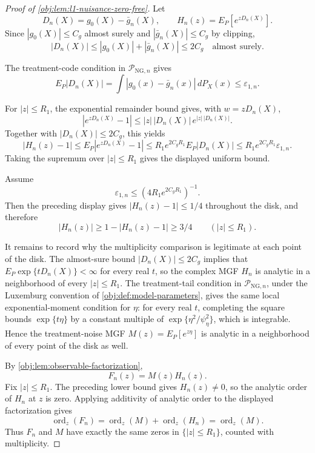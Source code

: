 \documentclass[11pt]{article}
\begin{document}
\begin{proof}[Proof of \cref{obj:lem:l1-nuisance-zero-free}]
Let
\[
D_n(X)=g_0(X)-\bar g_n(X),
\qquad
H_n(z)=E_P[e^{zD_n(X)}].
\]
Since \(|g_0(X)|\le C_g\) almost surely and \(|\bar g_n(X)|\le C_g\) by
clipping,
\[
|D_n(X)|\le |g_0(X)|+|\bar g_n(X)|\le2C_g
\quad\text{almost surely}.
\]

The treatment-code condition in \(\mathcal P_{\mathrm{NG},n}\) gives
\[
E_P|D_n(X)|
=
\int |g_0(x)-\bar g_n(x)|\,dP_X(x)
\le
\varepsilon_{1,n}.
\]

For \(|z|\le R_1\), the exponential remainder bound gives, with
\(w=zD_n(X)\),
\[
|e^{zD_n(X)}-1|
\le
|z|\,|D_n(X)|\,e^{|z|\,|D_n(X)|}.
\]
Together with \(|D_n(X)|\le2C_g\), this yields
\[
|H_n(z)-1|
\le
E_P|e^{zD_n(X)}-1|
\le
R_1 e^{2C_gR_1}E_P|D_n(X)|
\le
R_1 e^{2C_gR_1}\varepsilon_{1,n}.
\]
Taking the supremum over \(|z|\le R_1\) gives the displayed uniform bound. %

Assume
\[
\varepsilon_{1,n}\le (4R_1e^{2C_gR_1})^{-1}.
\]
Then the preceding display gives \(|H_n(z)-1|\le1/4\) throughout the disk, and
therefore
\[
|H_n(z)|\ge 1-|H_n(z)-1|\ge3/4
\qquad(|z|\le R_1).
\]

It remains to record why the multiplicity comparison is legitimate at each
point of the disk.  The almost-sure bound \(|D_n(X)|\le2C_g\) implies that
\(E_P\exp\{tD_n(X)\}<\infty\) for every real \(t\), so the complex MGF
\(H_n\) is analytic in a neighborhood of every \(|z|\le R_1\).  The treatment-tail
condition in \(\mathcal P_{\mathrm{NG},n}\), under the Luxemburg convention of
\cref{obj:def:model-parameters}, gives the same local exponential-moment
condition for \(\eta\): for every real \(t\), completing the square bounds
\(\exp\{t\eta\}\) by a constant multiple of
\(\exp\{\eta^2/\psi_\eta^2\}\), which is integrable.  Hence the treatment-noise
MGF \(M(z)=E_P[e^{z\eta}]\) is analytic in a neighborhood of every point of the
disk as well. %

By \cref{obj:lem:observable-factorization},
\[
F_n(z)=M(z)H_n(z).
\]
Fix \(|z|\le R_1\).  The preceding lower bound gives \(H_n(z)\ne0\), so the
analytic order of \(H_n\) at \(z\) is zero.  Applying additivity of analytic
order to the displayed factorization gives
\[
\operatorname{ord}_z(F_n)
=
\operatorname{ord}_z(M)+\operatorname{ord}_z(H_n)
=
\operatorname{ord}_z(M).
\]
Thus \(F_n\) and \(M\) have exactly the same zeros in \(\{|z|\le R_1\}\), counted
with multiplicity. %
\end{proof}
\end{document}
